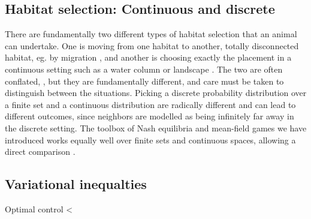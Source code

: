 \subsection*{Habitat selection: Continuous and discrete}
There are fundamentally two different types of habitat selection that an animal can undertake. One is moving from one habitat to another, totally disconnected habitat, eg. by migration \citep{}, and another is choosing exactly the placement in a continuous setting such as a water column or landscape \citep{}. The two are often conflated, \citep{patriziopaper, jerome}, but they are fundamentally different, and care must be taken to distinguish between the situations. Picking a discrete probability distribution over a finite set and a continuous distribution are radically different and can lead to different outcomes, since neighbors are modelled as being infinitely far away in the discrete setting. The toolbox of Nash equilibria and mean-field games we have introduced works equally well over finite sets and continuous spaces, allowing a direct comparison \citep{}.
\subsection{Variational inequalties}
Optimal control
<

